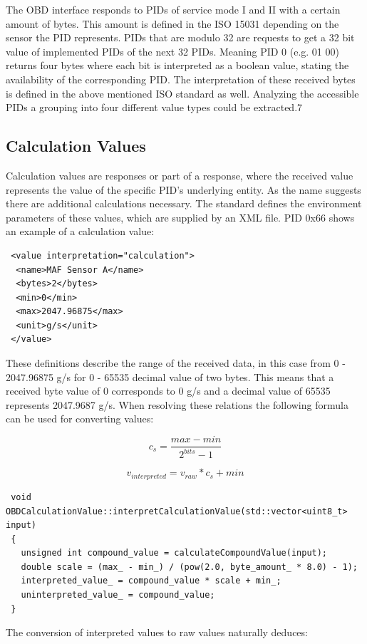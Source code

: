 The OBD interface responds to PIDs of service mode I and II with a certain amount of bytes. This amount is defined in the ISO 15031 depending 
on the sensor the PID represents. PIDs that are modulo 32 are requests to get a 32 bit value of implemented PIDs of the next 32 PIDs. Meaning 
PID 0 (e.g. 01 00) returns four bytes where each bit is interpreted as a boolean value, stating the availability of the corresponding PID. The 
interpretation of these received bytes is defined in the above mentioned ISO standard as well. Analyzing the accessible PIDs a grouping into 
four different value types could be extracted.7

\subsection{Calculation Values}
Calculation values are responses or part of a response, where the received value represents the value of the specific PID’s underlying entity.
As the name suggests there are additional calculations necessary. The standard defines the environment parameters of these values, which are 
supplied by an XML file. PID 0x66 shows an example of a calculation value:

\begin{verbatim}
 <value interpretation="calculation">
  <name>MAF Sensor A</name>
  <bytes>2</bytes>
  <min>0</min>
  <max>2047.96875</max>
  <unit>g/s</unit>
 </value>
\end{verbatim}

These definitions describe the range of the received data, in this case from 0 - 2047.96875 g/s for 0 - 65535 decimal value of two bytes. 
This means that a received byte value of 0 corresponds to 0 g/s and a decimal value of 65535 represents 2047.9687 g/s. When resolving these 
relations the following formula can be used for converting values: 

\[ c_s = \frac{max - min}{2^{bits} - 1} \]

\[ v_{interpreted} = v_{raw} * c_s + min \]

\begin{verbatim}
 void OBDCalculationValue::interpretCalculationValue(std::vector<uint8_t> input)
 {
   unsigned int compound_value = calculateCompoundValue(input);
   double scale = (max_ - min_) / (pow(2.0, byte_amount_ * 8.0) - 1);
   interpreted_value_ = compound_value * scale + min_;
   uninterpreted_value_ = compound_value;
 }
\end{verbatim}

The conversion of interpreted values to raw values  naturally deduces:

